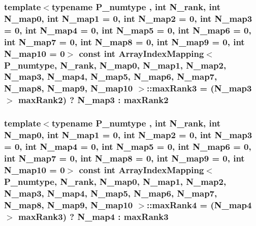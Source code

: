 \subsubsection[{max\+Rank3}]{\setlength{\rightskip}{0pt plus 5cm}template$<$typename P\+\_\+numtype , int N\+\_\+rank, int N\+\_\+map0, int N\+\_\+map1 = 0, int N\+\_\+map2 = 0, int N\+\_\+map3 = 0, int N\+\_\+map4 = 0, int N\+\_\+map5 = 0, int N\+\_\+map6 = 0, int N\+\_\+map7 = 0, int N\+\_\+map8 = 0, int N\+\_\+map9 = 0, int N\+\_\+map10 = 0$>$ const int {\bf Array\+Index\+Mapping}$<$ P\+\_\+numtype, N\+\_\+rank, N\+\_\+map0, N\+\_\+map1, N\+\_\+map2, N\+\_\+map3, N\+\_\+map4, N\+\_\+map5, N\+\_\+map6, N\+\_\+map7, N\+\_\+map8, N\+\_\+map9, N\+\_\+map10 $>$\+::max\+Rank3 = (N\+\_\+map3 $>$ {\bf max\+Rank2}) ? N\+\_\+map3 \+: {\bf max\+Rank2}\hspace{0.3cm}{\ttfamily [static]}}\label{classArrayIndexMapping_ae8774956b8f4a23da006bca9db0ffbbf}
\hypertarget{classArrayIndexMapping_a7bd141f55526934737e4903226ce767c}{}
\subsubsection[{max\+Rank4}]{\setlength{\rightskip}{0pt plus 5cm}template$<$typename P\+\_\+numtype , int N\+\_\+rank, int N\+\_\+map0, int N\+\_\+map1 = 0, int N\+\_\+map2 = 0, int N\+\_\+map3 = 0, int N\+\_\+map4 = 0, int N\+\_\+map5 = 0, int N\+\_\+map6 = 0, int N\+\_\+map7 = 0, int N\+\_\+map8 = 0, int N\+\_\+map9 = 0, int N\+\_\+map10 = 0$>$ const int {\bf Array\+Index\+Mapping}$<$ P\+\_\+numtype, N\+\_\+rank, N\+\_\+map0, N\+\_\+map1, N\+\_\+map2, N\+\_\+map3, N\+\_\+map4, N\+\_\+map5, N\+\_\+map6, N\+\_\+map7, N\+\_\+map8, N\+\_\+map9, N\+\_\+map10 $>$\+::max\+Rank4 = (N\+\_\+map4 $>$ {\bf max\+Rank3}) ? N\+\_\+map4 \+: {\bf max\+Rank3}\hspace{0.3cm}{\ttfamily [static]}}\label{classArrayIndexMapping_a7bd141f55526934737e4903226ce767c}
\hypertarget{classArrayIndexMapping_a4b9450766582f18fe4117e077f823f08}{}
